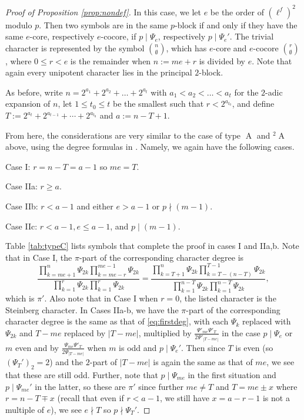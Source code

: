 \documentclass[12pt,leqno,a4paper]{amsart}
\newcommand{\tw}[1]{{}^#1\!}
\theoremstyle{remark}
\newcommand\type[1]{\operatorname{#1}}
\begin{document}
\begin{proof}[Proof of Proposition \ref{prop:nondef}]
In this case, we let $e$ be the order of $({\ell^f})^2$ modulo $p$.  Then two symbols are in the same $p$-block if and only if they have the same $e$-core, respectively $e$-cocore, if $p\mid \Psi_e$, respectively $p\mid \Psi_e'$.   The trivial character is represented by the symbol $n \choose \emptyset$, which has $e$-core and $e$-cocore $r\choose\emptyset$, where $0\leq r< e$ is the remainder when $n:=me+r$ is divided by $e$.  Note that again every unipotent character  lies in the principal $2$-block.



As before, write $n=2^{a_1}+2^{a_2}+\ldots+2^{a_t}$ with $a_1<a_2<\ldots<a_t$ for the $2$-adic expansion of $n$, let $1\leq t_0\leq t$ be the smallest such that $r<2^{a_{t_0}}$, and define $T:=2^{a_t}+2^{a_{t-1}}+\cdots +2^{a_{t_0}}$ and $a:=n-T+1$.  
 

From here, the considerations are very similar to the case of type $\type{A}$ and $\tw{2}\type{A}$ above, using the degree formulas in \cite[Section 13.8]{carter}.  Namely, we again have the following cases.  


\indent Case I: $r=n-T=a-1$ so $me=T$.

\indent Case IIa: $r\geq a$.

\indent Case IIb: $r<a-1$ and either $e>a-1$ or $p\nmid (m-1)$.

\indent Case IIc: $r<a-1, e\leq a-1$, and $p\mid (m-1)$.





 Table \ref{tab:typeC} lists symbols that complete the proof in cases I and IIa,b. Note that in Case I, the $\pi$-part of the corresponding character degree is 
 \[\frac{\prod_{k=me+1}^n \Psi_{2k} \prod_{k=me-r}^{me-1}\Psi_{2k}}{\prod_{k=1}^{r}\Psi_{2k}\prod_{k=1}^{r}\Psi_{2k}}=\frac{\prod_{k=T+1}^n \Psi_{2k} \prod_{k=T-(n-T)}^{T-1}\Psi_{2k}}{\prod_{k=1}^{n-T}\Psi_{2k}\prod_{k=1}^{n-T}\Psi_{2k}},\]
 which is $\pi'$.  Also note that in Case I when $r=0$, the listed character is the Steinberg character.  In Cases IIa-b, we have the $\pi$-part of the corresponding character degree is the same as that of \eqref{eq:firstdeg}, with each $\Psi_k$ replaced with $\Psi_{2k}$ and $T-me$ replaced by $|T-me|$, multiplied by $\frac{\Psi'_{me}\Psi'_T}{2\Psi'_{|T-me|}}$ in the case $p\mid \Psi_e$ or $m$ even and by $\frac{\Psi_{me}\Psi'_T}{2\Psi_{|T-me|}}$ when $m$ is odd and $p\mid \Psi_e'$.
  Then since $T$ is even (so $(\Psi_T')_2=2$) and the $2$-part of $|T-me|$ is again the same as that of $me$, we see that these are still odd.  Further, note that $p\mid \Psi_{me}$ in the first situation and $p\mid \Psi_{me}'$ in the latter, so these are $\pi'$ since further $me\neq T$ and $T=me\pm x$ where $r=n-T\mp x$ (recall that even if $r<a-1$, we still have $x=a-r-1$ is not a multiple of $e$), we see $e\nmid T$ so $p\nmid \Psi_T'$. 
 

\end{proof}
\end{document}
